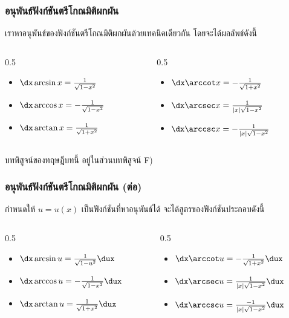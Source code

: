 \begin{frame}
\frametitle{อนุพันธ์ฟังก์ชันตรีโกณมิติผกผัน}
เราหาอนุพันธ์ของฟังก์ชันตรีโกณมิติผกผันด้วยเทคนิคเดียวกัน โดยจะได้ผลลัพธ์ดังนี้
\begin{thm}{}{}
\begin{columns}
	\begin{column}{0.5\textwidth}
			\begin{itemize}
				\item $\dx \arcsin x = \frac{1}{\sqrt{1-x^2}}$
				\item $\dx \arccos x = -\frac{1}{\sqrt{1-x^2}}$
				\item $ \dx \arctan x = \frac{1}{\sqrt{1+x^2}}$		
			\end{itemize}
	\end{column}
	\begin{column}{0.5\textwidth}
			\begin{itemize}
				\item $\dx \arccot x = -\frac{1}{\sqrt{1+x^2}}$
				\item $\dx \arcsec x = \frac{1}{|x|\sqrt{1-x^2}}$
				\item $ \dx \arccsc x = -\frac{1}{|x|\sqrt{1-x^2}}$
			\end{itemize}
	\end{column}
\end{columns}
\end{thm}
บทพิสูจน์ของทฤษฎีบทนี้ อยู่ในส่วนบทพิสูจน์ F)
\end{frame}

\begin{frame}
\frametitle{อนุพันธ์ฟังก์ชันตรีโกณมิติผกผัน (ต่อ)}
กำหนดให้ $u = u(x)$ เป็นฟังก์ชันที่หาอนุพันธ์ได้ จะได้สูตรของฟังก์ชันประกอบดังนี้
\begin{thm}{}{}
\begin{columns}
	\begin{column}{0.5\textwidth}
			\begin{itemize}
				\item $\dx \arcsin u = \frac{1}{\sqrt{1-u^2}} \dux $
				\item $\dx \arccos u = -\frac{1}{\sqrt{1-x^2}} \dux $
				\item $ \dx \arctan u = \frac{1}{\sqrt{1+x^2}} \dux$		
			\end{itemize}
	\end{column}
	\begin{column}{0.5\textwidth}
			\begin{itemize}
				\item $\dx \arccot u = -\frac{1}{\sqrt{1+x^2}} \dux $
				\item $\dx \arcsec u = \frac{1}{|x|\sqrt{1-x^2}} \dux $
				\item $ \dx \arccsc u = \frac{-1}{|x|\sqrt{1-x^2}} \dux$
			\end{itemize}
	\end{column}
\end{columns}
\end{thm}
\end{frame}


